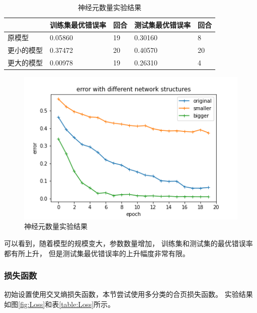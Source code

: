 \documentclass{article}
\begin{document}
\begin{table}[h]
\centering
\begin{tabular}{|l|l|l|l|l|} 
\hline
& 训练集最优错误率 & 回合 & 测试集最优错误率 & 回合 \\
\hline
原模型 & 0.05860 & 19 & 0.30160 & 8 \\
更小的模型 & 0.37472 & 20 & 0.40570 & 20 \\
更大的模型 & 0.00978 & 19 & 0.26310 & 4 \\
\hline
\end{tabular}
\caption{神经元数量实验结果}
\label{table:SizeResult}
\end{table}

\begin{figure}[p]
\includegraphics[width=\textwidth]
{Result/NN bigger/figure.png}
\caption{神经元数量实验结果}
\label{fig:Size}
\end{figure}

可以看到，随着模型的规模变大，参数数量增加，
训练集和测试集的最优错误率都有所上升，
但是测试集最优错误率的上升幅度非常有限。

\subsubsection{损失函数}

初始设置使用交叉熵损失函数，本节尝试使用多分类的合页损失函数。
实验结果如图\ref{fig:Loss}和表\ref{table:Loss}所示。
\end{document}
